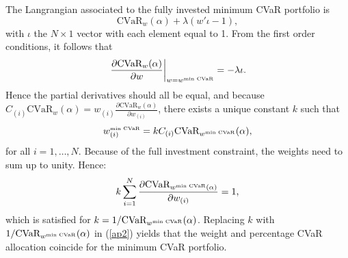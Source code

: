 \documentclass[12pt,a4paper]{article}
\begin{document}
The Langrangian associated to the fully invested minimum CVaR portfolio is
\begin{equation}  \mbox{CVaR}_w(\alpha) + \lambda ( w'\iota - 1 ),\end{equation}
with $\iota$ the $N\times 1$ vector with each element equal to 1.
From the first order conditions, it follows that
\begin{equation}  \left.\frac{ \partial \mbox{CVaR}_w(\alpha)}{\partial w}\right|_{w=w^{\mbox{\tiny min CVaR}}} = -\lambda \iota. \label{ap1}\end{equation}
Hence the partial derivatives should all be equal, and because $C_{(i)} \mbox{CVaR}_w(\alpha)= w_{(i)}\frac{ \partial \mbox{CVaR}_w(\alpha)}{\partial w_{(i)}} $, there exists a unique constant $k$ such that
\begin{equation} w_{(i)}^{\mbox{\tiny min CVaR}} = k C_{(i)} \mbox{CVaR}_{w^{\mbox{\tiny min CVaR}}}(\alpha), \label{ap2}\end{equation} for all $i=1,\ldots,N$.
Because of the full investment constraint, the weights need to sum up to unity. Hence:
 \begin{equation} k \sum_{i=1}^N \frac{ \partial \mbox{CVaR}_{w^{\mbox{\tiny min CVaR}}(\alpha)}}{\partial w_{(i)}} = 1, \label{ap3}\end{equation}
which is satisfied for $k=1/\mbox{CVaR}_{w^{\mbox{\tiny min CVaR}}}(\alpha)$. Replacing $k$ with $1/\mbox{CVaR}_{w^{\mbox{\tiny min CVaR}}}(\alpha)$ in (\ref{ap2}) yields that the weight and percentage CVaR allocation coincide for the minimum CVaR portfolio.




\end{document}
